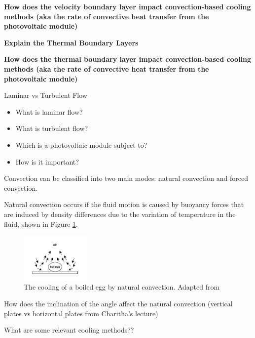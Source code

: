 \vspace{0.5em}

\textbf{How does the velocity boundary layer impact convection-based cooling methods (aka the rate of convective heat transfer from the photovoltaic module)}\par

\textbf{Explain the Thermal Boundary Layers}\par
\textbf{How does the thermal boundary layer impact convection-based cooling methods (aka the rate of convective heat transfer from the photovoltaic module)}\vspace{0.5em}

Laminar vs Turbulent Flow\par
\begin{itemize}
    \item What is laminar flow?
    \item What is turbulent flow?
    \item Which is a photovoltaic module subject to?
    \item How is it important?
\end{itemize}

Convection can be classified into two main modes: natural convection and forced convection. \cite{Cengel2014IntroductionConcepts}

Natural convection occurs if the fluid motion is caused by buoyancy forces that are induced by density differences due to the variation of temperature in the fluid, shown in Figure \ref{fig:cooling_of_boiled_egg_natural_convection}.

\begin{figure}[ht]
    \centering
    \includegraphics[width=0.3\textwidth]{Figures/cooling_of_boiled_egg_natural_convection.pdf}
    \caption{The cooling of a boiled egg by natural convection. Adapted from \cite{Cengel2014IntroductionConcepts}}
    \label{fig:cooling_of_boiled_egg_natural_convection}
\end{figure}

How does the inclination of the angle affect the natural convection (vertical plates vs horizontal plates from Charitha's lecture)\par
What are some relevant cooling methods??\par

